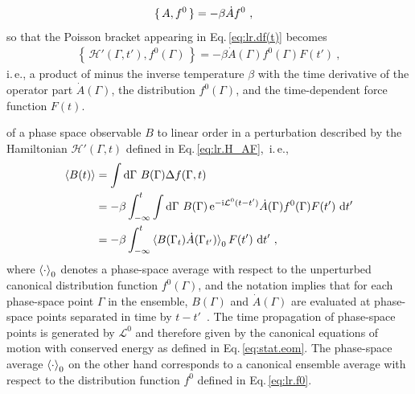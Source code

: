 \begin{align}
  \set{A, f^0}
    &= -\beta \dot A f^0~,
   \label{eq:lr.dA_dt}
\end{align}
so that the Poisson bracket %
appearing in Eq.\,\eqref{eq:lr.df(t)} becomes
\begin{align}
	\left\{\, \mathcal  H' (\Gamma, t'), f^0 (\Gamma) \,\right\}
		= - \beta \dot{A} (\Gamma) f^0 (\Gamma) F(t')~,
	\label{eq:.lr.poisson.H'}
\end{align}
i.\,e., a product of minus the inverse temperature $\beta$ with the time derivative of the operator part $\dot A (\Gamma)$, the distribution $f^0 (\Gamma)$, and the time-dependent force function $F (t)$.

 of a phase space observable $B$ to linear order in a perturbation described by the Hamiltonian $\mathcal H'(\Gamma, t)$ defined in Eq.\,\eqref{eq:lr.H_AF},~i.\,e.,~
\begin{align}
\braket{B (t)}
    &= \int \d \Gamma ~  B (\Gamma) \Delta f (\Gamma, t) \\
    &= - \beta \int_{-\infty}^t 
      \int \d \Gamma ~  
       B (\Gamma) \, {\rm e}^{-\im \mathcal L^0 (t - t')} \dot{A}(\Gamma)
       f^0(\Gamma) F(t') ~ \d t' \\
    &= - \beta \int_{-\infty}^t 
      \braket{B(\Gamma_t) \dot{A} (\Gamma_{t'})}_{0} F(t') ~ \d t'~,
  \label{eq:lr.dB}
\end{align}
where $\braket{\cdot}_{0}$ denotes a phase-space average with respect to the unperturbed canonical distribution function $f^0 (\Gamma)$, and the notation implies that for each phase-space point $\Gamma$ in the ensemble, $B (\Gamma)$ and $\dot{A} (\Gamma)$ are evaluated at phase-space points separated in time by $t-t'$~\cite[p.\,498]{Tuckerman}.
The time propagation of phase-space points is generated by $\mathcal L^0$ and therefore given by the canonical equations of motion with conserved energy as defined in Eq.\,\eqref{eq:stat.eom}. The phase-space average $\braket{\cdot}_{0}$ on the other hand corresponds to a canonical ensemble average with respect to the distribution function $f^0$ defined in Eq.\,\eqref{eq:lr.f0}.

